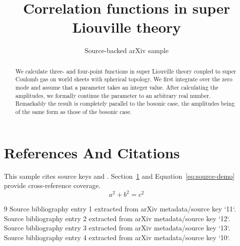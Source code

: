 \documentclass[11pt]{article}
\title{Correlation functions in super Liouville theory}
\author{Source-backed arXiv sample}
\date{}
\begin{document}
\maketitle
\begin{abstract}
We calculate three- and four-point functions in super Liouville theory coupled to super Coulomb gas on world sheets with spherical topology. We first integrate over the zero mode and assume that a parameter takes an integer value. After calculating the amplitudes, we formally continue the parameter to an arbitrary real number. Remarkably the result is completely parallel to the bosonic case, the amplitudes being of the same form as those of the bosonic case.
\end{abstract}
\section{References And Citations}
\label{sec:refs}
This sample cites source keys \cite{11} and \cite{12}. Section~\ref{sec:refs} and Equation~\ref{eq:source-demo} provide cross-reference coverage.
\begin{equation}
\label{eq:source-demo}
a^2 + b^2 = c^2
\end{equation}
\begin{thebibliography}{9}
 Source bibliography entry 1 extracted from arXiv metadata/source key `11`.
 Source bibliography entry 2 extracted from arXiv metadata/source key `12`.
 Source bibliography entry 3 extracted from arXiv metadata/source key `13`.
 Source bibliography entry 4 extracted from arXiv metadata/source key `10`.
\end{thebibliography}
\end{document}
